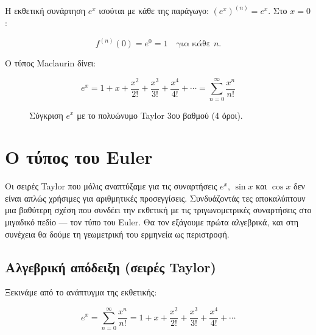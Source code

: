 Η εκθετική συνάρτηση \(e^x\) ισούται με κάθε της παράγωγο:
\((e^x)^{(n)} = e^x\). Στο \(x=0\):

\[
f^{(n)}(0) = e^0 = 1 \quad \text{για κάθε } n.
\]

Ο τύπος Maclaurin δίνει:

\[
e^x = 1 + x + \frac{x^2}{2!} + \frac{x^3}{3!} + \frac{x^4}{4!} + \cdots = \sum_{n=0}^{\infty} \frac{x^n}{n!}
\]

\begin{figure}[htbp]
\centering
{}
\caption{Σύγκριση $e^x$ με το πολυώνυμο Taylor 3ου βαθμού (4 όροι).}
\label{fig:exptaylor}
\end{figure}

\section{Ο τύπος του
Euler}\label{ux3bf-ux3c4ux3cdux3c0ux3bfux3c2-ux3c4ux3bfux3c5-euler}

Οι σειρές Taylor που μόλις αναπτύξαμε για τις συναρτήσεις \(e^x\),
\(\sin x\) και \(\cos x\) δεν είναι απλώς χρήσιμες για αριθμητικές
προσεγγίσεις. Συνδυάζοντάς τες αποκαλύπτουν μια βαθύτερη σχέση που
συνδέει την εκθετική με τις τριγωνομετρικές συναρτήσεις στο μιγαδικό
πεδίο --- τον τύπο του Euler. Θα τον εξάγουμε πρώτα αλγεβρικά, και στη
συνέχεια θα δούμε τη γεωμετρική του ερμηνεία ως περιστροφή.

\subsection{Αλγεβρική απόδειξη (σειρές
Taylor)}\label{ux3b1ux3bbux3b3ux3b5ux3b2ux3c1ux3b9ux3baux3ae-ux3b1ux3c0ux3ccux3b4ux3b5ux3b9ux3beux3b7-ux3c3ux3b5ux3b9ux3c1ux3adux3c2-taylor}

Ξεκινάμε από το ανάπτυγμα της εκθετικής:

\[
e^{x} = \sum_{n=0}^{\infty} \frac{x^n}{n!} = 1 + x + \frac{x^2}{2!} + \frac{x^3}{3!} + \frac{x^4}{4!} + \cdots
\]

